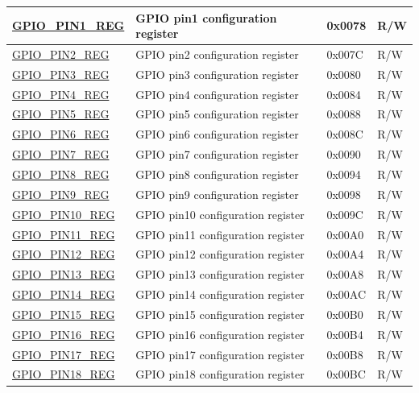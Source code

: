 \begin{longtable}{ | p{6cm} | p{7.2cm} | p{1.3cm} | p{1cm} | }
\hyperref[regdesc:GPIOPINNREG]{GPIO\_PIN1\_REG} & GPIO pin1 configuration register & 0x0078 & R/W \\ \hline
\hyperref[regdesc:GPIOPINNREG]{GPIO\_PIN2\_REG} & GPIO pin2 configuration register & 0x007C & R/W \\ \hline
\hyperref[regdesc:GPIOPINNREG]{GPIO\_PIN3\_REG} & GPIO pin3 configuration register & 0x0080 & R/W \\ \hline
\hyperref[regdesc:GPIOPINNREG]{GPIO\_PIN4\_REG} & GPIO pin4 configuration register & 0x0084 & R/W \\ \hline
\hyperref[regdesc:GPIOPINNREG]{GPIO\_PIN5\_REG} & GPIO pin5 configuration register & 0x0088 & R/W \\ \hline
\hyperref[regdesc:GPIOPINNREG]{GPIO\_PIN6\_REG} & GPIO pin6 configuration register & 0x008C & R/W \\ \hline
\hyperref[regdesc:GPIOPINNREG]{GPIO\_PIN7\_REG} & GPIO pin7 configuration register & 0x0090 & R/W \\ \hline
\hyperref[regdesc:GPIOPINNREG]{GPIO\_PIN8\_REG} & GPIO pin8 configuration register & 0x0094 & R/W \\ \hline
\hyperref[regdesc:GPIOPINNREG]{GPIO\_PIN9\_REG} & GPIO pin9 configuration register & 0x0098 & R/W \\ \hline
\hyperref[regdesc:GPIOPINNREG]{GPIO\_PIN10\_REG} & GPIO pin10 configuration register & 0x009C & R/W \\ \hline
\hyperref[regdesc:GPIOPINNREG]{GPIO\_PIN11\_REG} & GPIO pin11 configuration register & 0x00A0 & R/W \\ \hline
\hyperref[regdesc:GPIOPINNREG]{GPIO\_PIN12\_REG} & GPIO pin12 configuration register & 0x00A4 & R/W \\ \hline
\hyperref[regdesc:GPIOPINNREG]{GPIO\_PIN13\_REG} & GPIO pin13 configuration register & 0x00A8 & R/W \\ \hline
\hyperref[regdesc:GPIOPINNREG]{GPIO\_PIN14\_REG} & GPIO pin14 configuration register & 0x00AC & R/W \\ \hline
\hyperref[regdesc:GPIOPINNREG]{GPIO\_PIN15\_REG} & GPIO pin15 configuration register & 0x00B0 & R/W \\ \hline
\hyperref[regdesc:GPIOPINNREG]{GPIO\_PIN16\_REG} & GPIO pin16 configuration register & 0x00B4 & R/W \\ \hline
\hyperref[regdesc:GPIOPINNREG]{GPIO\_PIN17\_REG} & GPIO pin17 configuration register & 0x00B8 & R/W \\ \hline
\hyperref[regdesc:GPIOPINNREG]{GPIO\_PIN18\_REG} & GPIO pin18 configuration register & 0x00BC & R/W \\ \hline

\end{longtable}

